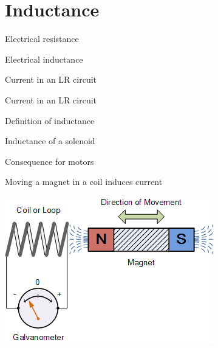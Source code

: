 \documentclass[compress]{beamer}
\begin{document}
\section{Inductance}

{
    \begin{frame}{Electrical resistance}
    \end{frame}
}

{
    \begin{frame}{Electrical inductance}
    \end{frame}
}

{
    \begin{frame}{Current in an LR circuit}
    \end{frame}
}

{
    \begin{frame}{Current in an LR circuit}
    \end{frame}
}

{
    \begin{frame}{Definition of inductance}
    \end{frame}
}

{
    \begin{frame}{Inductance of a solenoid}
    \end{frame}
}


\begin{frame}{Consequence for motors}

  Moving a magnet in a coil induces current


    \begin{center}
        \includegraphics[width=0.6\linewidth]{image29}


    \end{center}
\end{frame}
\end{document}

